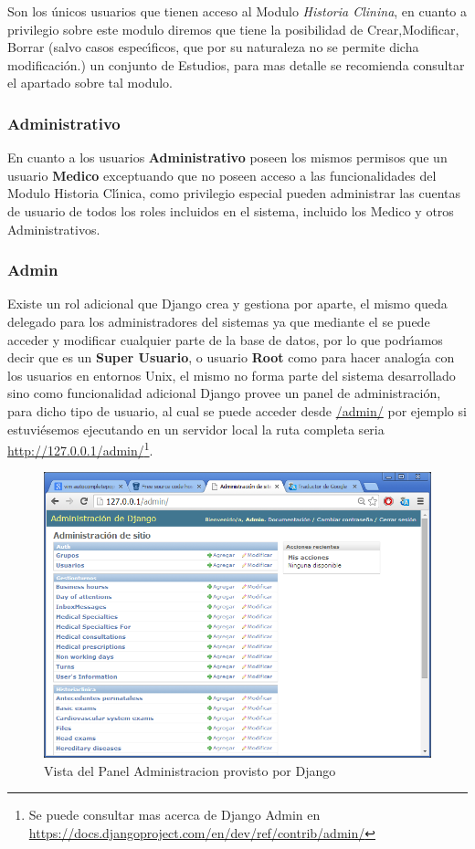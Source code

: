 Son los \'unicos usuarios que tienen acceso al Modulo \textit{Historia Clinina}, en cuanto
a privilegio sobre este modulo diremos que tiene la posibilidad de Crear,Modificar,
Borrar (salvo casos espec\'{\i}ficos, que por su naturaleza no se permite dicha 
modificaci\'on.) un conjunto de Estudios, para mas detalle se recomienda consultar
el apartado sobre tal modulo.


\subsubsection{Administrativo}

En cuanto a los usuarios \textbf{Administrativo} poseen los mismos permisos que 
un usuario \textbf{Medico} exceptuando que no poseen acceso a las funcionalidades 
del Modulo Historia Cl\'{\i}nica, como privilegio especial pueden administrar las 
cuentas de usuario de todos los roles incluidos en el sistema, incluido los 
Medico y otros Administrativos.

\subsubsection{Admin}

Existe un rol adicional que Django crea y gestiona por aparte, el mismo queda 
delegado para los administradores del sistemas ya que mediante el se puede acceder
y modificar cualquier parte de la base de datos, por lo que podr\'{\i}amos decir que 
es un \textbf{Super Usuario}, o usuario \textbf{Root} como para hacer analog\'{\i}a
con los usuarios en entornos Unix, el mismo no forma parte del sistema desarrollado
sino como funcionalidad adicional Django provee un panel de administraci\'on, 
para dicho tipo de usuario, al cual se puede acceder desde \url{/admin/} por ejemplo
si estuvi\'esemos ejecutando en un servidor local la ruta completa seria 
\url{http://127.0.0.1/admin/}\footnote{Se puede consultar mas acerca de Django
Admin en \url{https://docs.djangoproject.com/en/dev/ref/contrib/admin/}}.\\[0.1cm]


\begin{figure}[h]
    \centering
    \includegraphics[scale=0.5]{resourse/django-admin.png}
    \caption{Vista del Panel Administracion provisto por Django}
    \label{fig:123}
\end{figure}  


